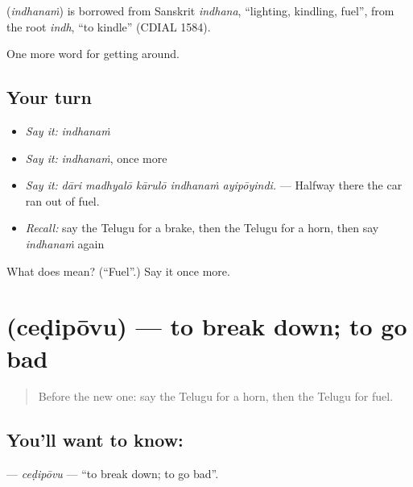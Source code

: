 \begin{cousinweb}
\textbf{} (\emph{indhanaṁ}) is borrowed from Sanskrit \emph{indhana}, \textquotedblleft{}lighting, kindling, fuel\textquotedblright{}, from the root \emph{indh}, \textquotedblleft{}to kindle\textquotedblright{} (CDIAL 1584).
\end{cousinweb}

\begin{grammarlens}[title={What you've built}]
One more word for getting around.
\end{grammarlens}

\subsection*{Your turn}
\begin{itemize}
\raggedright
  \item \emph{Say it:} \emph{indhanaṁ}
  \item \emph{Say it:} \emph{indhanaṁ}, once more
  \item \emph{Say it:} \emph{dāri madhyalō kārulō indhanaṁ ayipōyindi.} — Halfway there the car ran out of fuel.
  \item \emph{Recall:} say the Telugu for a brake, then the Telugu for a horn, then say \emph{indhanaṁ} again
\end{itemize}

\begin{tcolorbox}[breakable,colback=teal!4,colframe=teal!35!black,title={Before you move on}]
What does  mean? (\textquotedblleft{}Fuel\textquotedblright{}.) Say it once more.
\end{tcolorbox}
\section[\texorpdfstring{\te{చెడిపోవు} (ceḍipōvu)}{చెడిపోవు (ceḍipōvu)}]{ (ceḍipōvu) — to break down; to go bad}

\label{lesson:TE-C444-cedipovu}



\begin{quote}
Before the new one: say the Telugu for a horn, then the Telugu for fuel.
\end{quote}

\subsection*{You'll want to know: }
\textbf{} — \emph{ceḍipōvu} — \textquotedblleft{}to break down; to go bad\textquotedblright{}.

